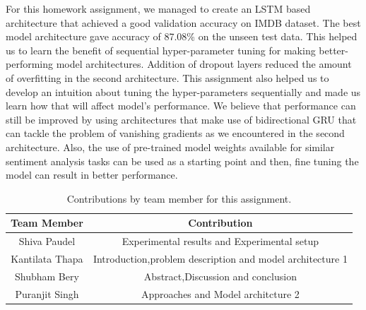 \documentclass{article}
\begin{document}
For this homework assignment, we managed to create an LSTM based architecture that achieved a good validation accuracy on IMDB dataset. The best model architecture gave accuracy of 87.08\% on the unseen test data. This helped us to learn the benefit of sequential hyper-parameter tuning for making better-performing model architectures. Addition of dropout layers reduced the amount of overfitting in the second architecture. This assignment also helped us to develop an intuition about tuning the hyper-parameters sequentially and made us learn how that will affect model's performance. We believe that performance can still be improved by using architectures that make use of bidirectional GRU that can tackle the problem of vanishing gradients as we encountered in the second architecture. Also, the use of pre-trained model weights available for similar sentiment analysis tasks can be used as a starting point and then, fine tuning the model can result in better performance.

\begin{table}[H]
    \caption{Contributions by team member for this assignment.}
    \centering
    \begin{tabular}{|c|c|} \hline
    {\bf Team Member}     &  {\bf Contribution}  \\ \hline
    Shiva Paudel     & Experimental results and Experimental setup   \\
    Kantilata Thapa   & Introduction,problem description and model architecture 1 \\
    Shubham Bery    & Abstract,Discussion and conclusion \\
    Puranjit Singh     & Approaches and  Model architcture 2  \\\hline
    \end{tabular}
    \label{tab:contribution}
\end{table}



\end{document}
